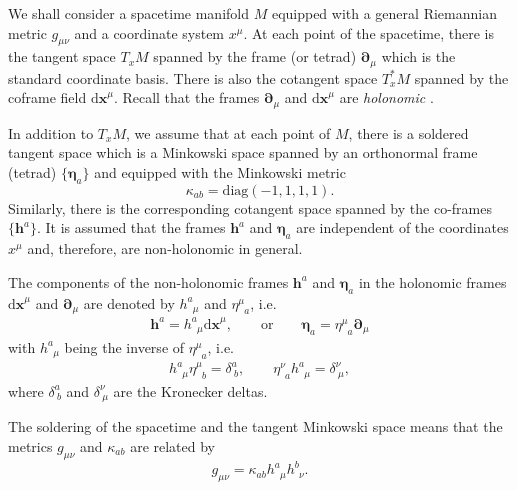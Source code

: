 \documentclass[
10pt, %
a4paper, %
oneside, %
headinclude,footinclude, %
BCOR5mm, %
]{scrartcl}
\newcommand{\mg}[1]{\kappa_{#1}}			%
\newcommand{\pdd}[1]{{\bm{\partial}_{#1}}}
\newcommand{\dx}[1]{{\bm{\mathrm{d}x}^{#1}}}
\newcommand{\tetrsymbol}{h}
\newcommand{\itetrsymbol}{\eta}
\newcommand{\itetr}[2]{\itetrsymbol^{#1}_{\phantom{#1}#2}}
\newcommand{\tetr}[2]{\tetrsymbol^{#1}_{\phantom{#1}#2}}
\newcommand{\cobas}[1]{\bm{\tetrsymbol}^{#1}}
\newcommand{\bas}[1]{\bm{\itetrsymbol}_{#1}}
\newcommand{\KD}[2]{\delta^{#1}_{\ #2}}
\newcommand{\ho}[1]{\textcolor{magenta}{HO: #1}}
\begin{document}
We shall consider a spacetime manifold $ M $ equipped with a general Riemannian metric $ g_{\mu\nu} 
$ and a coordinate system $ x^\mu $. At each 
point of 
the spacetime, there is the tangent space $ T_{x}M $ spanned by the frame (or tetrad) $ 
\pdd{\mu} $ which is the standard coordinate basis. 
There is also the cotangent space $ T_x^*M $ spanned by the coframe field $ \dx{\mu} $. 
Recall that the frames $ \pdd{\mu} $ and $ \dx{\mu} $ are \emph{holonomic} 
\cite{AldrovandiPereiraBook}.


In addition to $ T_{x}M $, we assume that at each point of $ M $, there is a soldered tangent space 
which is a Minkowski space spanned by an orthonormal frame (tetrad) $ \{ \bas{a} \}$ and equipped 
with 
the 
Minkowski metric 
\begin{equation}\label{eqn.mg}
	\mg{ab} = \text{diag}(-1,1,1,1).
\end{equation}
Similarly, there is the 
corresponding cotangent space spanned by the co-frames $ \{ \cobas{a} \}$. It is assumed 
that the frames $ \cobas{a} $ and $ \bas{a} $ are independent of the coordinates $ x^\mu $ and, 
therefore, are non-holonomic in general.

The components of the non-holonomic frames $ \cobas{a} $ and $ \bas{a} $ in the holonomic 
frames $ \dx{\mu} $ and $ \pdd{\mu} $ are denoted by $ \tetr{a}{\mu} $ and $ \itetr{\mu}{a} $, i.e. 
\begin{equation}
	\cobas{a} = \tetr{a}{\mu}\dx{\mu}, \qquad \text{or} \qquad \bas{a} = \itetr{\mu}{a}\pdd{\mu}
\end{equation}
with $ \tetr{a}{\mu} $ being the inverse of $ \itetr{\mu}{a} $, i.e.
\begin{equation}\label{eqn.inv.tetr}
	\tetr{a}{\mu} \itetr{\mu}{b} = \KD{a}{b},
	\qquad
	\itetr{\nu}{a}\tetr{a}{\mu}  = \KD{\nu}{\mu},
\end{equation}
where $ \KD{a}{b} $ and $ \KD{\nu}{\mu} $ are the Kronecker deltas.

The soldering of the spacetime and the tangent Minkowski space means that the metrics $ g_{\mu\nu} 
$ and $ \mg{ab} $ are related by  
\begin{equation}
	g_{\mu\nu} = \mg{ab} \tetr{a}{\mu}\tetr{b}{\nu}.
\end{equation}
\end{document}
